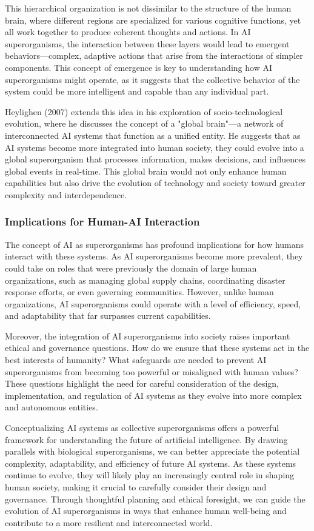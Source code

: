 \documentclass[12pt,twoside]{article}
\begin{document}
This hierarchical organization is not dissimilar to the structure of the human brain, where different regions are specialized for various cognitive functions, yet all work together to produce coherent thoughts and actions. In AI superorganisms, the interaction between these layers would lead to emergent behaviors—complex, adaptive actions that arise from the interactions of simpler components. This concept of emergence is key to understanding how AI superorganisms might operate, as it suggests that the collective behavior of the system could be more intelligent and capable than any individual part.

Heylighen (2007) extends this idea in his exploration of socio-technological evolution, where he discusses the concept of a "global brain"—a network of interconnected AI systems that function as a unified entity. He suggests that as AI systems become more integrated into human society, they could evolve into a global superorganism that processes information, makes decisions, and influences global events in real-time. This global brain would not only enhance human capabilities but also drive the evolution of technology and society toward greater complexity and interdependence.

\subsubsection{Implications for Human-AI Interaction}

The concept of AI as superorganisms has profound implications for how humans interact with these systems. As AI superorganisms become more prevalent, they could take on roles that were previously the domain of large human organizations, such as managing global supply chains, coordinating disaster response efforts, or even governing communities. However, unlike human organizations, AI superorganisms could operate with a level of efficiency, speed, and adaptability that far surpasses current capabilities.

Moreover, the integration of AI superorganisms into society raises important ethical and governance questions. How do we ensure that these systems act in the best interests of humanity? What safeguards are needed to prevent AI superorganisms from becoming too powerful or misaligned with human values? These questions highlight the need for careful consideration of the design, implementation, and regulation of AI systems as they evolve into more complex and autonomous entities.

Conceptualizing AI systems as collective superorganisms offers a powerful framework for understanding the future of artificial intelligence. By drawing parallels with biological superorganisms, we can better appreciate the potential complexity, adaptability, and efficiency of future AI systems. As these systems continue to evolve, they will likely play an increasingly central role in shaping human society, making it crucial to carefully consider their design and governance. Through thoughtful planning and ethical foresight, we can guide the evolution of AI superorganisms in ways that enhance human well-being and contribute to a more resilient and interconnected world.
\end{document}
